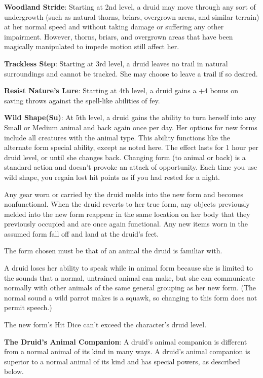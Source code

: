 \textbf{Woodland Stride}: Starting at 2nd level, a druid may move through any sort of undergrowth (such as natural thorns, briars, overgrown areas, and similar terrain) at her normal speed and without taking damage or suffering any other impairment. However, thorns, briars, and overgrown areas that have been magically manipulated to impede motion still affect her.

\textbf{Trackless Step}: Starting at 3rd level, a druid leaves no trail in natural surroundings and cannot be tracked. She may choose to leave a trail if so desired.

\textbf{Resist Nature's Lure}: Starting at 4th level, a druid gains a +4 bonus on saving throws against the spell-like abilities of fey.

\textbf{Wild Shape(Su)}: At 5th level, a druid gains the ability to turn herself into any Small or Medium animal and back again once per day. Her options for new forms include all creatures with the animal type. This ability functions like the alternate form special ability, except as noted here. The effect lasts for 1 hour per druid level, or until she changes back. Changing form (to animal or back) is a standard action and doesn’t provoke an attack of opportunity. Each time you use wild shape, you regain lost hit points as if you had rested for a night.

Any gear worn or carried by the druid melds into the new form and becomes nonfunctional. When the druid reverts to her true form, any objects previously melded into the new form reappear in the same location on her body that they previously occupied and are once again functional. Any new items worn in the assumed form fall off and land at the druid's feet.

The form chosen must be that of an animal the druid is familiar with.

A druid loses her ability to speak while in animal form because she is limited to the sounds that a normal, untrained animal can make, but she can communicate normally with other animals of the same general grouping as her new form. (The normal sound a wild parrot makes is a squawk, so changing to this form does not permit speech.)

The new form’s Hit Dice can’t exceed the character’s druid level.

\textbf{The Druid's Animal Companion}: A druid’s animal companion is different from a normal animal of its kind in many ways. A druid’s animal companion is superior to a normal animal of its kind and has special powers, as described below.

